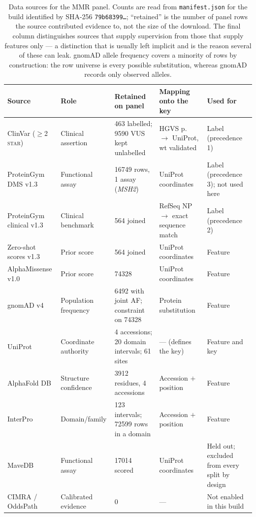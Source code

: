 \documentclass{bioinfo}
\newcommand{\gene}[1]{\textit{#1}}
\begin{document}
\begin{table}[t]
\caption{Data sources for the MMR panel. Counts are read from
\texttt{manifest.json} for the build identified by SHA-256
\texttt{79b68399\ldots}; ``retained'' is the number of panel rows the source
contributed evidence to, not the size of the download. The final column
distinguishes sources that supply supervision from those that supply features
only --- a distinction that is usually left implicit and is the reason several
of these can leak. gnomAD allele frequency covers a minority of rows by
construction: the row universe is every possible substitution, whereas gnomAD
records only observed alleles.}
\label{tab:sources}
\centering
\footnotesize
\setlength{\tabcolsep}{4pt}
\begin{tabularx}{\textwidth}{@{}L{0.95} L{0.80} L{1.25} L{1.15} L{0.85}@{}}
\toprule
Source & Role & Retained on panel & Mapping onto the key & Used for \\
\midrule
ClinVar ($\geq$2\,\textsc{star}) & Clinical assertion & 463 labelled; \num{9590} VUS kept unlabelled & HGVS p.\ $\rightarrow$ UniProt, wt validated & Label (precedence 1) \\
ProteinGym DMS v1.3 & Functional assay & \num{16749} rows, 1 assay (\gene{MSH2}) & UniProt coordinates & Label (precedence 3); not used here \\
ProteinGym clinical v1.3 & Clinical benchmark & 564 joined & RefSeq NP $\rightarrow$ exact sequence match & Label (precedence 2) \\
Zero-shot scores v1.3 & Prior score & 564 joined & UniProt coordinates & Feature \\
AlphaMissense v1.0 & Prior score & \num{74328} & UniProt coordinates & Feature \\
gnomAD v4 & Population frequency & \num{6492} with joint AF; constraint on \num{74328} & Protein substitution & Feature \\
UniProt & Coordinate authority & 4 accessions; 20 domain intervals; 61 sites & --- (defines the key) & Feature and key \\
AlphaFold DB & Structure confidence & \num{3912} residues, 4 accessions & Accession $+$ position & Feature \\
InterPro & Domain/family & 123 intervals; \num{72599} rows in a domain & Accession $+$ position & Feature \\
MaveDB & Functional assay & \num{17014} scored & UniProt coordinates & Held out; excluded from every split by design \\
CIMRA / OddsPath & Calibrated evidence & 0 & --- & Not enabled in this build \\
\bottomrule
\end{tabularx}
\end{table}
\end{document}
